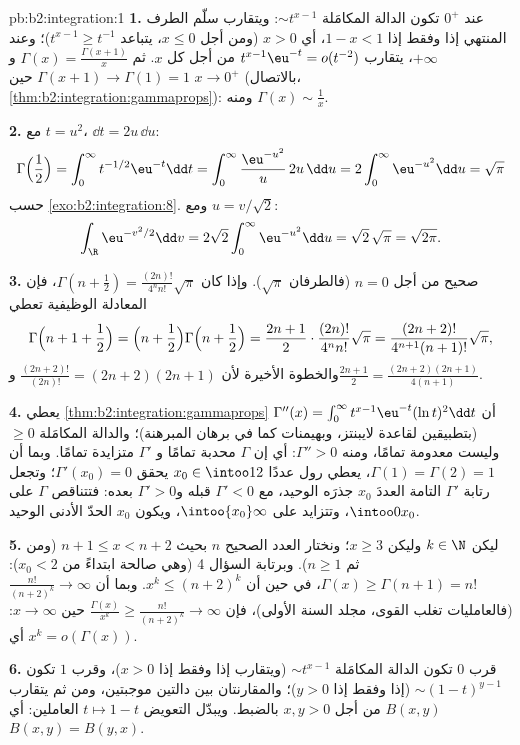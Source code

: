 \begin{solution}{pb:b2:integration:1}
\textbf{1.} عند $0^+$ تكون الدالة المكامَلة $\sim t^{x-1}$: ويتقارب
سلّم الطرف المنتهي إذا وفقط إذا $1 - x < 1$، أي $x > 0$
(ومن أجل $x \leq 0$، يتباعد $t^{x-1} \geq t^{-1}$)؛ وعند
$+\infty$، يتقارب $t^{x-1}\eu^{-t} = o(t^{-2})$ من أجل كل
$x$. ثم $\Gamma(x) = \frac{\Gamma(x+1)}{x}$ و$\Gamma(x+1)
\to \Gamma(1) = 1$ حين $x \to 0^+$ (بالاتصال،
\cref{thm:b2:integration:gammaprops}): ومنه $\Gamma(x) \sim
\frac1x$.

\textbf{2.} مع $t = u^2$، $\dd t = 2u\,\dd u$:
\[
\Gamma\Bigl(\frac12\Bigr) = \int_0^\infty
t^{-1/2}\eu^{-t}\dd t
= \int_0^\infty \frac{\eu^{-u^2}}{u}\,2u\,\dd u
= 2\int_0^\infty \eu^{-u^2}\dd u = \sqrt\pi
\]
حسب \cref{exo:b2:integration:8}. ومع $u = v/\sqrt2$:
\[
\int_\R \eu^{-v^2/2}\dd v
= 2\sqrt2\int_0^\infty \eu^{-u^2}\dd u
= \sqrt2\,\sqrt\pi = \sqrt{2\pi} .
\]

\textbf{3.} صحيح من أجل $n = 0$ (فالطرفان $\sqrt\pi$). وإذا كان
$\Gamma(n + \frac12) = \frac{(2n)!}{4^n n!}\sqrt\pi$، فإن المعادلة
الوظيفية تعطي
\[
\Gamma\Bigl(n + 1 + \frac12\Bigr)
= \Bigl(n + \frac12\Bigr)\Gamma\Bigl(n + \frac12\Bigr)
= \frac{2n+1}{2}\cdot\frac{(2n)!}{4^n n!}\sqrt\pi
= \frac{(2n+2)!}{4^{n+1}(n+1)!}\sqrt\pi ,
\]
والخطوة الأخيرة لأن $\frac{(2n+2)!}{(2n)!} = (2n+2)(2n+1)$
و$\frac{2n+1}{2} = \frac{(2n+2)(2n+1)}{4(n+1)}$.

\textbf{4.} يعطي \cref{thm:b2:integration:gammaprops} أن
$\Gamma''(x) = \int_0^\infty t^{x-1}\eu^{-t}(\ln t)^2\dd t$
(بتطبيقين لقاعدة لايبنتز، وبهيمنات كما في برهان
المبرهنة)؛ والدالة المكامَلة $\geq 0$ وليست معدومة
تمامًا، ومنه $\Gamma'' > 0$: أي إن $\Gamma$ محدبة تمامًا و
$\Gamma'$ متزايدة تمامًا. وبما أن $\Gamma(1) = \Gamma(2)
= 1$، يعطي رول عددًا $x_0 \in \intoo12$ يحقق $\Gamma'(x_0) =
0$؛ وتجعل رتابة $\Gamma'$ التامة العددَ $x_0$ جذرَه
الوحيد، مع $\Gamma' < 0$ قبله و$\Gamma' > 0$ بعده:
فتتناقص $\Gamma$ على $\intoo0{x_0}$، وتتزايد على
$\intoo{x_0}\infty$، ويكون $x_0$ الحدّ الأدنى الوحيد.

\textbf{5.} ليكن $k \in \N$ وليكن $x \geq 3$؛ ونختار العدد الصحيح
$n$ بحيث $n + 1 \leq x < n + 2$ (ومن ثم $n \geq 1$). وبرتابة
السؤال 4 (وهي صالحة ابتداءً من $x_0 < 2$): $\Gamma(x)
\geq \Gamma(n + 1) = n!$، في حين أن $x^k \leq (n+2)^k$. وبما أن
$\frac{n!}{(n+2)^k} \to \infty$ (فالعامليات تغلب القوى، مجلد السنة
الأولى)، فإن $\frac{\Gamma(x)}{x^k} \geq \frac{n!}{(n+2)^k} \to
\infty$ حين $x \to \infty$: أي $x^k = o(\Gamma(x))$.

\textbf{6.} قرب $0$ تكون الدالة المكامَلة $\sim t^{x-1}$
(ويتقارب إذا وفقط إذا $x > 0$)، وقرب $1$ تكون $\sim (1-t)^{y-1}$
(إذا وفقط إذا $y > 0$)؛ والمقارنتان بين دالتين موجبتين،
ومن ثم يتقارب $B(x,y)$ من أجل $x, y > 0$ بالضبط. ويبدّل التعويض
$t \mapsto 1 - t$ العاملين: أي $B(x,y) = B(y,x)$.


\end{solution}

